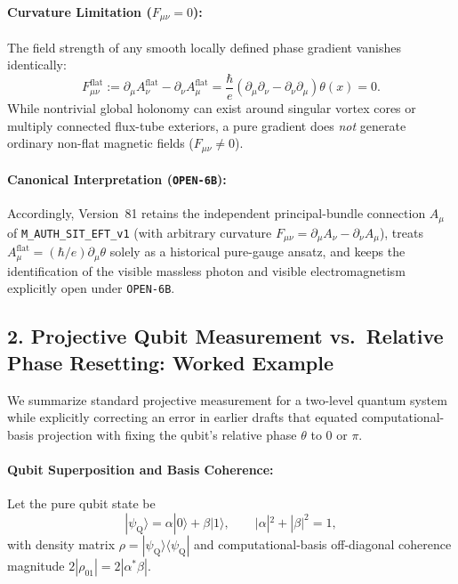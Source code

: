 \paragraph{Curvature Limitation ($F_{\mu\nu} = 0$):}
The field strength of any smooth locally defined phase gradient vanishes identically:
\[
F_{\mu\nu}^{\mathrm{flat}} := \partial_\mu A_\nu^{\mathrm{flat}} - \partial_\nu A_\mu^{\mathrm{flat}} = \frac{\hbar}{e} (\partial_\mu \partial_\nu - \partial_\nu \partial_\mu)\theta(x) = 0.
\]
While nontrivial global holonomy can exist around singular vortex cores or multiply connected flux-tube exteriors, a pure gradient does \emph{not} generate ordinary non-flat magnetic fields ($F_{\mu\nu} \ne 0$).

\paragraph{Canonical Interpretation (\texttt{OPEN-6B}):}
Accordingly, Version~81 retains the independent principal-bundle connection $A_\mu$ of \texttt{M\_AUTH\_SIT\_EFT\_v1} (with arbitrary curvature $F_{\mu\nu} = \partial_\mu A_\nu - \partial_\nu A_\mu$), treats $A_\mu^{\mathrm{flat}} = (\hbar/e)\partial_\mu\theta$ solely as a historical pure-gauge ansatz, and keeps the identification of the visible massless photon and visible electromagnetism explicitly open under \texttt{OPEN-6B}.

\subsection{2. Projective Qubit Measurement vs.\ Relative Phase Resetting: Worked Example}

We summarize standard projective measurement for a two-level quantum system while explicitly correcting an error in earlier drafts that equated computational-basis projection with fixing the qubit's relative phase $\theta$ to $0$ or $\pi$.

\paragraph{Qubit Superposition and Basis Coherence:}
Let the pure qubit state be
\[
|\psi_{\mathrm{Q}}\rangle = \alpha |0\rangle + \beta |1\rangle, \qquad |\alpha|^2 + |\beta|^2 = 1,
\]
with density matrix $\rho = |\psi_{\mathrm{Q}}\rangle\langle\psi_{\mathrm{Q}}|$ and computational-basis off-diagonal coherence magnitude $2|\rho_{01}| = 2|\alpha^*\beta|$.

